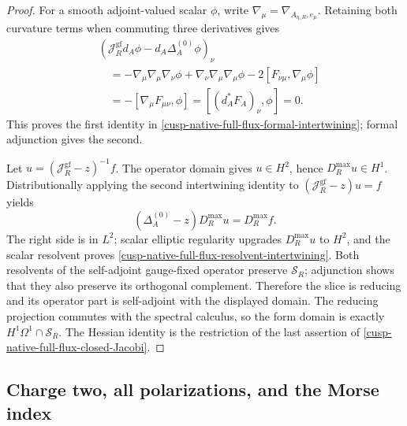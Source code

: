 \begin{proof}
For a smooth adjoint-valued scalar \(\phi\), write
\(\nabla_\mu=\nabla_{A_{\eta,R},e_\mu}\).  Retaining both curvature terms
when commuting three derivatives gives
\begin{align*}
 &(\mathcal J_R^{\mathrm{gf}}d_A\phi
       -d_A\Delta_A^{(0)}\phi)_\nu\\
 &\quad=-\nabla_\mu\nabla_\mu\nabla_\nu\phi
       +\nabla_\nu\nabla_\mu\nabla_\mu\phi
       -2[F_{\nu\mu},\nabla_\mu\phi]\\
 &\quad=-[\nabla_\mu F_{\mu\nu},\phi]
       =[(d_A^*F_A)_\nu,\phi]=0.
\end{align*}
This proves the first identity in
\cref{cusp-native-full-flux-formal-intertwining}; formal adjunction gives the
second.

Let \(u=(\mathcal J_R^{\mathrm{gf}}-z)^{-1}f\).  The operator domain gives
\(u\in H^2\), hence \(D_R^{\max}u\in H^1\).  Distributionally applying the
second intertwining identity to
\((\mathcal J_R^{\mathrm{gf}}-z)u=f\) yields
\[
 (\Delta_A^{(0)}-z)D_R^{\max}u=D_R^{\max}f.
\]
The right side is in \(L^2\); scalar elliptic regularity upgrades
\(D_R^{\max}u\) to \(H^2\), and the scalar resolvent proves
\cref{cusp-native-full-flux-resolvent-intertwining}.  Both resolvents of the
self-adjoint gauge-fixed operator preserve \(\mathscr S_R\); adjunction shows
that they also preserve its orthogonal complement.  Therefore the slice is
reducing and its operator part is self-adjoint with the displayed domain.
The reducing projection commutes with the spectral calculus, so the form
domain is exactly \(H^1\Omega^1\cap\mathscr S_R\).  The Hessian identity is
the restriction of the last assertion of
\cref{cusp-native-full-flux-closed-Jacobi}.
\end{proof}

\subsection{Charge two, all polarizations, and the Morse index}

